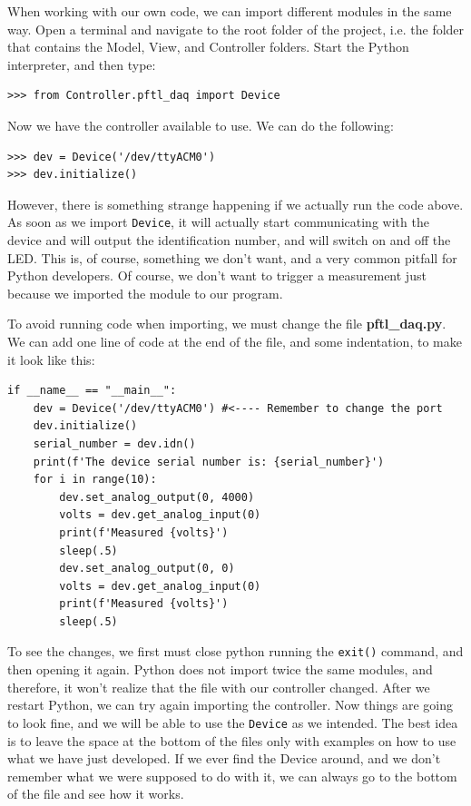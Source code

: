 When working with our own code, we can import different modules in the same way. Open a terminal and navigate to the root folder of the project, i.e. the folder that contains the Model, View, and Controller folders. Start the Python interpreter, and then type:

\begin{verbatim}
>>> from Controller.pftl_daq import Device
\end{verbatim}

Now we have the controller available to use. We can do the following:

\begin{verbatim}
>>> dev = Device('/dev/ttyACM0')
>>> dev.initialize()
\end{verbatim}

However, there is something strange happening if we actually run the code above. As soon as we import \texttt{Device}, it will actually start communicating with the device and will output the identification number, and will switch on and off the LED. This is, of course, something we don't want, and a very common pitfall for Python developers. Of course, we don't want to trigger a measurement just because we imported the module to our program.

To avoid running code when importing, we must change the file \textbf{pftl\_daq.py}. We can add one line of code at the end of the file, and some indentation, to make it look like this:

\begin{verbatim}
if __name__ == "__main__":
    dev = Device('/dev/ttyACM0') #<---- Remember to change the port
    dev.initialize()
    serial_number = dev.idn()
    print(f'The device serial number is: {serial_number}')
    for i in range(10):
        dev.set_analog_output(0, 4000)
        volts = dev.get_analog_input(0)
        print(f'Measured {volts}')
        sleep(.5)
        dev.set_analog_output(0, 0)
        volts = dev.get_analog_input(0)
        print(f'Measured {volts}')
        sleep(.5)
\end{verbatim}

To see the changes, we first must close python running the \texttt{exit()} command, and then opening it again. Python does not import twice the same modules, and therefore, it won't realize that the file with our controller changed. After we restart Python, we can try again importing the controller. Now things are going to look fine, and we will be able to use the \texttt{Device} as we intended. The best idea is to leave the space at the bottom of the files only with examples on how to use what we have just developed. If we ever find the Device around, and we don't remember what we were supposed to do with it, we can always go to the bottom of the file and see how it works.

